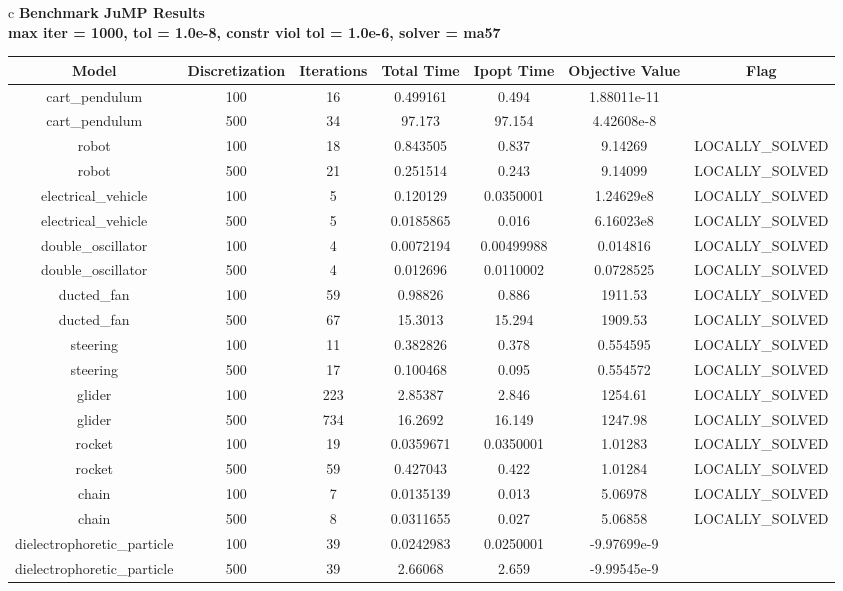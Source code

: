 \documentclass{standalone}
\begin{document}
\begin{tabular}{c}
\Large\textbf{Benchmark JuMP Results}\\
\large\textbf{max iter = 1000, tol = 1.0e-8, constr viol tol = 1.0e-6, solver = ma57}\\
\begin{tabular}{ccccccc}
  \hline
  \textbf{Model} & \textbf{Discretization} & \textbf{Iterations} & \textbf{Total Time} & \textbf{Ipopt Time} & \textbf{Objective Value} & \textbf{Flag} \\\hline
  cart\_pendulum & 100 & 16 & 0.499161 & 0.494 & 1.88011e-11 & \color{red}{LOCALLY\_INFEASIBLE} \\
  cart\_pendulum & 500 & 34 & 97.173 & 97.154 & 4.42608e-8 & \color{red}{LOCALLY\_INFEASIBLE} \\
  robot & 100 & 18 & 0.843505 & 0.837 & 9.14269 & LOCALLY\_SOLVED \\
  robot & 500 & 21 & 0.251514 & 0.243 & 9.14099 & LOCALLY\_SOLVED \\
  electrical\_vehicle & 100 & 5 & 0.120129 & 0.0350001 & 1.24629e8 & LOCALLY\_SOLVED \\
  electrical\_vehicle & 500 & 5 & 0.0185865 & 0.016 & 6.16023e8 & LOCALLY\_SOLVED \\
  double\_oscillator & 100 & 4 & 0.0072194 & 0.00499988 & 0.014816 & LOCALLY\_SOLVED \\
  double\_oscillator & 500 & 4 & 0.012696 & 0.0110002 & 0.0728525 & LOCALLY\_SOLVED \\
  ducted\_fan & 100 & 59 & 0.98826 & 0.886 & 1911.53 & LOCALLY\_SOLVED \\
  ducted\_fan & 500 & 67 & 15.3013 & 15.294 & 1909.53 & LOCALLY\_SOLVED \\
  steering & 100 & 11 & 0.382826 & 0.378 & 0.554595 & LOCALLY\_SOLVED \\
  steering & 500 & 17 & 0.100468 & 0.095 & 0.554572 & LOCALLY\_SOLVED \\
  glider & 100 & 223 & 2.85387 & 2.846 & 1254.61 & LOCALLY\_SOLVED \\
  glider & 500 & 734 & 16.2692 & 16.149 & 1247.98 & LOCALLY\_SOLVED \\
  rocket & 100 & 19 & 0.0359671 & 0.0350001 & 1.01283 & LOCALLY\_SOLVED \\
  rocket & 500 & 59 & 0.427043 & 0.422 & 1.01284 & LOCALLY\_SOLVED \\
  chain & 100 & 7 & 0.0135139 & 0.013 & 5.06978 & LOCALLY\_SOLVED \\
  chain & 500 & 8 & 0.0311655 & 0.027 & 5.06858 & LOCALLY\_SOLVED \\
  dielectrophoretic\_particle & 100 & 39 & 0.0242983 & 0.0250001 & -9.97699e-9 & \color{red}{LOCALLY\_INFEASIBLE} \\
  dielectrophoretic\_particle & 500 & 39 & 2.66068 & 2.659 & -9.99545e-9 & \color{red}{LOCALLY\_INFEASIBLE} \\\hline
\end{tabular}
\end{tabular}
\end{document}

